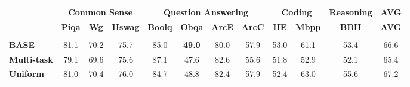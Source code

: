 \begin{table}[ht]
\small
\centering
\begin{adjustbox}
{width=1.0\textwidth}
\begin{tabular}{l|cccccccccc|c} 
\Xhline{1.6pt}
\multicolumn{1}{c|}{} & \multicolumn{3}{c}{\textbf{Common Sense}} & \multicolumn{4}{c}{\textbf{Question Answering}} & \multicolumn{2}{c}{\textbf{Coding}} & \multicolumn{1}{c}{\textbf{ Reasoning}} & \multicolumn{1}{c}{\textbf{AVG}} \\
\cmidrule(lr){2-4}  \cmidrule(lr){5-8} \cmidrule(lr){9-10}
\cmidrule(lr){11-11}
\multicolumn{1}{c|}{} & \textbf{Piqa} & \textbf{Wg} & \textbf{Hswag} & \textbf{Boolq} & \textbf{Obqa} & \textbf{ArcE} & \textbf{ArcC} & \textbf{HE} & \textbf{Mbpp} & \textbf{BBH} & \multicolumn{1}{c}{\textbf{AVG}} \\
\midrule

\rowcolor{lightgray}\multicolumn{12}{c}{\textbf{Phi-3 (3B) with LoRA library }} \\
\textbf{BASE} & 81.1 & 70.2 & 75.7 & 85.0 & \textbf{49.0} & 80.0 & 57.9 & 53.0 & 61.1 & 53.4 & \cellcolor[HTML]{FDE9E8}66.6\\ 

\textbf{Multi-task}   & 79.1&69.6&75.6&87.1&47.6&82.6&55.6&51.8&52.9& 52.1 &\cellcolor[HTML]{FDE9E8}65.4 \\

\textbf{Uniform} & 81.0&70.4&76.0&84.7&48.8&82.4&57.9&52.4&63.0&55.6&\cellcolor[HTML]{FDE9E8}67.2\\


\end{tabular}
\end{adjustbox}
\end{table}
